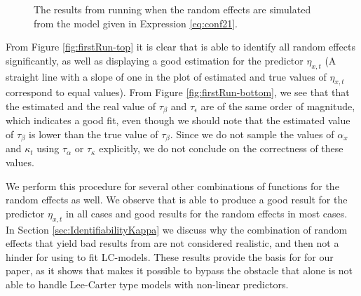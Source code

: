 \begin{figure}[h!]
    \caption{The results from running \inlabru when the random effects are simulated from the model given in Expression \ref{eq:conf21}. }
    \label{fig:firstRun}
\end{figure}
\newpar From Figure \ref{fig:firstRun-top} it is clear that \inlabru is able to identify all random effects significantly, as well as displaying a good estimation for the predictor $\eta_{x,t}$ (A straight line with a slope of one in the plot of estimated and true values of $\eta_{x,t}$ correspond to equal values). From Figure \ref{fig:firstRun-bottom}, we see that that the estimated and the real value of $\tau_\beta$ and $\tau_\epsilon$ are of the same order of magnitude, which indicates a good fit, even though we should note that the estimated value of $\tau_\beta$ is lower than the true value of $\tau_\beta$. Since we do not sample the values of $\alpha_x$ and $\kappa_t$ using $\tau_\alpha$ or $\tau_\kappa$ explicitly, we do not conclude on the correctness of these values. 

\newpar We perform this procedure for several other combinations of functions for the random effects as well. We observe that \inlabru is able to produce a good result for the predictor $\eta_{x,t}$ in all cases and good results for the random effects in most cases. In Section \ref{sec:IdentifiabilityKappa} we discuss why the combination of random effects that yield bad results from \inlabru are not considered realistic, and then not a hinder for using \inlabru to fit LC-models. These results provide the basis for for our paper, as it shows that \inlabru makes it possible to bypass the obstacle that \inla alone is not able to handle Lee-Carter type models with non-linear predictors.


